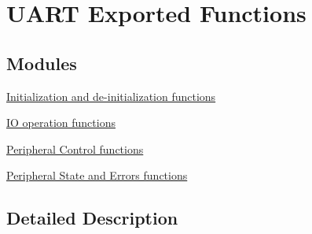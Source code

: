 \hypertarget{group___u_a_r_t___exported___functions}{\section{U\-A\-R\-T Exported Functions}
\label{group___u_a_r_t___exported___functions}
}
\subsection*{Modules}
\begin{DoxyCompactItemize}
\item 
\hyperlink{group___u_a_r_t___exported___functions___group1}{Initialization and de-\/initialization functions}
\item 
\hyperlink{group___u_a_r_t___exported___functions___group2}{I\-O operation functions}
\item 
\hyperlink{group___u_a_r_t___exported___functions___group3}{Peripheral Control functions}
\item 
\hyperlink{group___u_a_r_t___exported___functions___group4}{Peripheral State and Errors functions}
\end{DoxyCompactItemize}


\subsection{Detailed Description}

